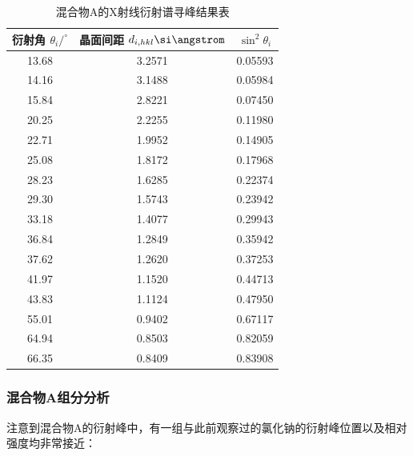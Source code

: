 \documentclass{thuemp}
\begin{document}
\begin{table}
    \centering
    \captionnamefont{\wuhao\bf\heiti}
    \captiontitlefont{\wuhao\bf\heiti}
    \caption{混合物A的X射线衍射谱寻峰结果表}
    \label{tab:mixture_a_xrd}
    \liuhao
    \begin{tabular}{ccc}
        \toprule
        衍射角 $\theta_i /^\circ$ & 晶面间距 $d_{i,hkl}\text{\si\angstrom}$ & $\sin^2 \theta_i$ \\
        \midrule
        13.68 & 3.2571 & 0.05593\\
        14.16 & 3.1488 & 0.05984\\
        15.84 & 2.8221 & 0.07450\\
        20.25 & 2.2255 & 0.11980\\
        22.71 & 1.9952 & 0.14905\\
        25.08 & 1.8172 & 0.17968\\
        28.23 & 1.6285 & 0.22374\\
        29.30 & 1.5743 & 0.23942\\
        33.18 & 1.4077 & 0.29943\\
        36.84 & 1.2849 & 0.35942\\
        37.62 & 1.2620 & 0.37253\\
        41.97 & 1.1520 & 0.44713\\
        43.83 & 1.1124 & 0.47950\\
        55.01 & 0.9402 & 0.67117\\
        64.94 & 0.8503 & 0.82059\\
        66.35 & 0.8409 & 0.83908\\
        \bottomrule
    \end{tabular}
\end{table}

\subsubsection{混合物A组分分析}

注意到混合物A的衍射峰中，有一组与此前观察过的氯化钠的衍射峰位置以及相对强度均非常接近：
\end{document}
